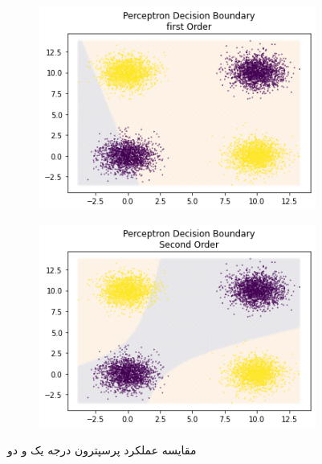 \documentclass[12pt, a4paper]{article}
\begin{document}
\begin{figure}[h]
    \begin{subfigure}{0.45\linewidth}
        \centering
        \includegraphics[width=\linewidth]{images/6/perceptron_first.png}
    \end{subfigure}
    \hfill
    \begin{subfigure}{0.45\linewidth}
        \centering
        \includegraphics[width=\linewidth]{images/6/perceptron_sec.png}
    \end{subfigure}
    \caption{مقایسه عملکرد پرسپترون درجه یک و دو}
\end{figure}
\end{document}
